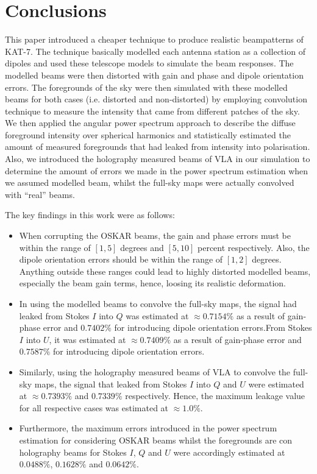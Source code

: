\documentclass[fleqn,usenatbib]{mnras}
\begin{document}
\section{Conclusions} \label{sec:conclusions}
This paper introduced a cheaper technique to produce realistic beampatterns of KAT-7. The technique basically  modelled each antenna station as a collection of dipoles and used these telescope models to simulate the beam responses. The modelled beams were then distorted with gain and phase and dipole orientation errors. The foregrounds of the sky were then simulated with these modelled beams for both cases (i.e. distorted and non-distorted) by employing convolution technique to measure the intensity that came from different patches of the sky. We then applied the angular power spectrum approach to describe the diffuse foreground intensity over spherical harmonics and statistically estimated the amount of measured foregrounds that had leaked from intensity into polarisation. Also, we introduced the holography measured beams of VLA in our simulation to determine the amount of errors we made in the power spectrum estimation when we assumed modelled beam, whilst the full-sky maps were actually convolved with  ``real'' beams.

The key findings in this work were as follows:
%
\begin{itemize}%
\item When corrupting the OSKAR beams, the gain and phase errors must be within the range of $[1,5]$ degrees and $[5, 10]$ percent respectively. Also, the dipole orientation errors should be within the range of $[1, 2]$ degrees. Anything outside these ranges could lead to highly distorted modelled beams, especially the beam gain terms, hence, loosing its realistic deformation.

\item In using the modelled beams to convolve the full-sky maps, the signal had leaked from Stokes $I$ into $Q$ was estimated at $\approx 0.7154 \%$ as a result of gain-phase error and $ 0.7402 \%$ for introducing dipole orientation errors.From Stokes $I$ into $U$, it was estimated at $\approx 0.7409 \%$ as a result of gain-phase error and $0.7587 \%$ for introducing dipole orientation errors. 

\item Similarly, using the holography measured beams of VLA to convolve the full-sky maps, the signal that leaked from Stokes $I$ into $Q$ and $U$ were  estimated at $\approx 0.7393 \%$ and $0.7339 \%$ respectively. Hence, the maximum leakage value for all respective cases was estimated at $\approx 1.0 \%$.

\item Furthermore, the maximum errors introduced in the power spectrum estimation for considering  OSKAR beams whilst the foregrounds are con holography beams for Stokes $I$, $Q$ and $U$ were accordingly estimated at $ 0.0488 \%$,  $0.1628 \%$ and $0.0642 \%$.
\end{itemize}
\end{document}
